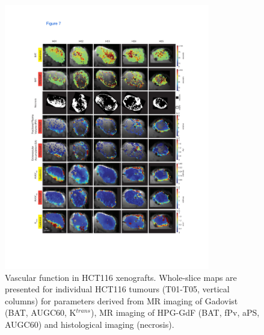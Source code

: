 \begin{figure}[htbp]
 \begin{center}
 \includegraphics[width=0.8\textwidth]{hpg/hpg-paper1-images/hpg_fig7-hct116.pdf}
 \caption{Vascular function in HCT116 xenografts. Whole-slice maps are presented for individual HCT116 tumours (T01-T05, vertical columns) for parameters derived from MR imaging of Gadovist (BAT, AUGC60, K$^{trans}$), MR imaging of HPG-GdF (BAT, fPv, aPS, AUGC60) and histological imaging (necrosis).}
 \label{hpgpaper1:fig7}
 \end{center}
\end{figure}

